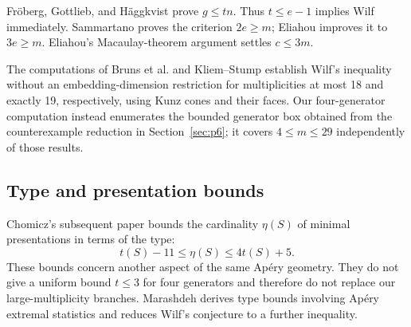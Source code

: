 Fr\"oberg, Gottlieb, and H\"aggkvist \cite{FGH} prove \(g\le tn\).
Thus \(t\le e-1\) implies
Wilf immediately. Sammartano \cite{Sammartano} proves the criterion
\(2e\ge m\); Eliahou \cite{Graph} improves it to \(3e\ge m\).
Eliahou's Macaulay-theorem argument \cite{Macaulay} settles
\(c\le3m\).

The computations of Bruns et al. \cite[Theorem~4.3]{B} and Kliem--Stump
\cite[Proposition~6.9, published version]{KS} establish Wilf's inequality
without an embedding-dimension restriction for multiplicities at most 18
and exactly 19, respectively, using Kunz cones and their faces. Our
four-generator computation instead enumerates the bounded generator box
obtained from the counterexample reduction in Section~\ref{sec:p6}; it
covers \(4\le m\le29\) independently of those results.

\subsection{Type and presentation bounds}

Chomicz's subsequent paper \cite{CT} bounds the cardinality \(\eta(S)\)
of minimal presentations in terms of the type:
\[
t(S)-11\le\eta(S)\le4t(S)+5.
\]
These bounds concern another aspect of the same Ap\'ery geometry.
They do not give a uniform bound \(t\le3\) for four generators and
therefore do not replace our large-multiplicity branches.
Marashdeh \cite{M} derives type bounds involving Ap\'ery extremal
statistics and reduces Wilf's conjecture to a further inequality.
